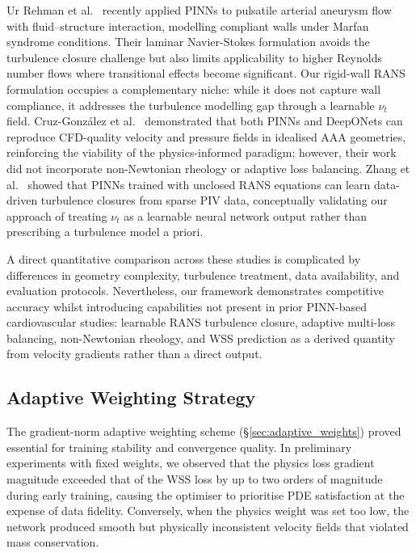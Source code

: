 \documentclass[11pt,a4paper]{article}
\begin{document}
Ur Rehman et al.\ \cite{ref_urrehman2025} recently applied PINNs to pulsatile arterial aneurysm flow with fluid--structure interaction, modelling compliant walls under Marfan syndrome conditions. Their laminar Navier-Stokes formulation avoids the turbulence closure challenge but also limits applicability to higher Reynolds number flows where transitional effects become significant. Our rigid-wall RANS formulation occupies a complementary niche: while it does not capture wall compliance, it addresses the turbulence modelling gap through a learnable $\nu_t$ field. Cruz-Gonz{\'a}lez et al.\ \cite{ref_cruzgonzalez2025} demonstrated that both PINNs and DeepONets can reproduce CFD-quality velocity and pressure fields in idealised AAA geometries, reinforcing the viability of the physics-informed paradigm; however, their work did not incorporate non-Newtonian rheology or adaptive loss balancing. Zhang et al.\ \cite{ref_zhang2025} showed that PINNs trained with unclosed RANS equations can learn data-driven turbulence closures from sparse PIV data, conceptually validating our approach of treating $\nu_t$ as a learnable neural network output rather than prescribing a turbulence model a priori.

A direct quantitative comparison across these studies is complicated by differences in geometry complexity, turbulence treatment, data availability, and evaluation protocols. Nevertheless, our framework demonstrates competitive accuracy whilst introducing capabilities not present in prior PINN-based cardiovascular studies: learnable RANS turbulence closure, adaptive multi-loss balancing, non-Newtonian rheology, and WSS prediction as a derived quantity from velocity gradients rather than a direct output.

\subsection{Adaptive Weighting Strategy}

The gradient-norm adaptive weighting scheme (\S\ref{sec:adaptive_weights}) proved essential for training stability and convergence quality. In preliminary experiments with fixed weights, we observed that the physics loss gradient magnitude exceeded that of the WSS loss by up to two orders of magnitude during early training, causing the optimiser to prioritise PDE satisfaction at the expense of data fidelity. Conversely, when the physics weight was set too low, the network produced smooth but physically inconsistent velocity fields that violated mass conservation.
\end{document}
